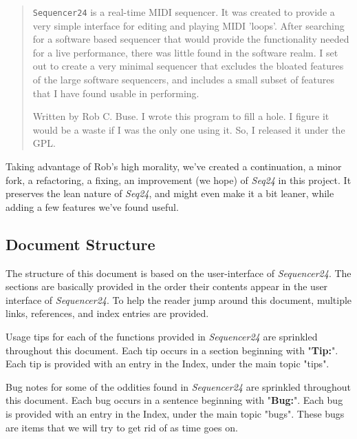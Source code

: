 \documentclass[
 11pt,
 twoside,
 a4paper,
 headinclude,
 footinclude,
 final                                 %
]{article}
\begin{document}
   \begin{quotation}
      \texttt{Sequencer24} is a real-time MIDI sequencer. It was created to
      provide a very simple interface for editing and playing MIDI 'loops'.
      After searching for a software based sequencer that would provide the
      functionality needed for a live performance, there was little found in
      the software realm. I set out to create a very minimal sequencer that
      excludes the bloated features of the large software sequencers, and
      includes a small subset of features that I have found usable in
      performing. 

      Written by Rob C. Buse.  I wrote this program to fill a
      hole.  I figure it would be a waste if I was the only one
      using it.  So, I released it under the GPL.
   \end{quotation}

   Taking advantage of Rob's high morality, we've created a continuation,
   a minor fork, a refactoring, a fixing, an improvement (we hope) of
   \textsl{Seq24} in this project.  It preserves the lean nature of
   \textsl{Seq24}, and might even make it a bit leaner, while adding a few
   features we've found useful.

\subsection{Document Structure}
\label{subsec:introduction_document_structure}

   The structure of this document is based on the user-interface of
   \textsl{Sequencer24}.  The sections are basically provided in the order
   their contents appear in the user interface of \textsl{Sequencer24}.  To
   help the reader jump around this document, multiple links, references,
   and index entries are provided.

   Usage tips
   for each of the functions provided in
   \textsl{Sequencer24} are sprinkled throughout this document.
   Each tip occurs in a section beginning with "\textbf{Tip:}".
   Each tip is provided with an entry in the Index, under the
   main topic "tips".

   Bug notes
   for some of the oddities found in \textsl{Sequencer24} are
   sprinkled throughout this document.
   Each bug occurs in a sentence beginning with "\textbf{Bug:}".
   Each bug is provided with an entry in the Index, under the
   main topic "bugs".  These bugs are items that we will try to
   get rid of as time goes on.
\end{document}
